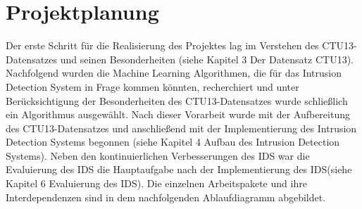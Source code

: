 \documentclass[main.tex]{subfiles}
\begin{document}
\section{Projektplanung}

Der erste Schritt für die Realisierung des Projektes lag im Verstehen des CTU13-Datensatzes und seinen Besonderheiten (siehe Kapitel 3 Der Datensatz CTU13). Nachfolgend wurden die Machine Learning Algorithmen, die für das Intrusion Detection System in Frage kommen könnten, recherchiert und unter Berücksichtigung der Besonderheiten des CTU13-Datensatzes wurde schließlich ein Algorithmus ausgewählt. Nach dieser Vorarbeit wurde mit der Aufbereitung des CTU13-Datensatzes und anschließend mit der Implementierung des Intrusion Detection Systems begonnen (siehe Kapitel 4 Aufbau des Intrusion Detection Systems). Neben den kontinuierlichen Verbesserungen des IDS war die Evaluierung des IDS die Hauptaufgabe nach der Implementierung des IDS(siehe Kapitel 6 Evaluierung des IDS). 
Die einzelnen Arbeitspakete und ihre Interdependenzen sind in dem nachfolgenden Ablaufdiagramm abgebildet. 
\end{document}
